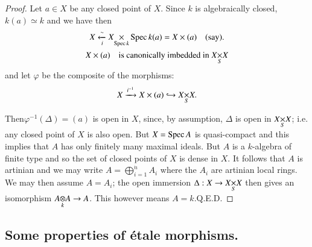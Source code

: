\begin{proof}
Let $a\in X$ be any closed point of $X$. Since $k$ is algebraically
closed, $k(a)\simeq k$ and we have then
\begin{gather*}
X\xleftarrow[i]{\sim} \fprod{X}{\Spec}{\Spec k} k(a)=X\times
(a)\quad\text{(say).}\\
X\times (a)\quad\text{is canonically imbedded in } \fprod{X}{X}{S}
\end{gather*}
and let $\varphi$ be the composite of the morphisms:
$$
X\xrightarrow{i^{-1}}X\times (a)\hookrightarrow \fprod{X}{X}{S}. 
$$

Then\pageoriginale $\varphi^{-1}(\Delta)=(a)$ is open in $X$, since,
by assumption, $\Delta$ is open in $\fprod{X}{X}{S}$; i.e. any closed
point of $X$ is also open. But $X=\operatorname{Spec} A$ is quasi-compact and this
implies that $A$ has only finitely many maximal ideals. But $A$ is a
$k$-algebra of finite type and so the set of closed points of $X$ is
dense in $X$. It follows that $A$ is artinian and we may write
$A=\bigoplus\limits^{\dot{n}}_{i=1}A_{i}$ where the $A_{i}$ are
artinian local rings. We may then assume $A=A_{i}$; the open immersion
$\Delta:X\to \fprod{X}{X}{S}$ then gives an isomorphism
$\foprod{A}{A}{k}\to A$. This however means $A=k$.\hfill Q.E.D.
\end{proof}

\setcounter{subsection}{2}
\subsection{Some properties of \'etale morphisms.}\label{chap3-sec3.3.3}

